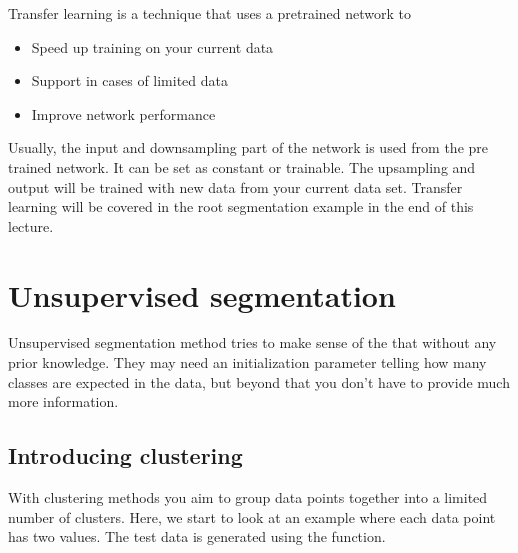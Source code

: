 \documentclass[letterpaper,10pt,english]{sphinxmanual}
\begin{document}
Transfer learning is a technique that uses a pre\sphinxhyphen{}trained network to
\begin{itemize}
\item {} 
Speed up training on your current data

\item {} 
Support in cases of limited data

\item {} 
Improve network performance

\end{itemize}

Usually, the input and downsampling part of the network is used from the pre trained network. It can be set as constant or trainable. The upsampling and output will be trained with new data from your current data set. Transfer learning will be covered in the root segmentation example in the end of this lecture.


\chapter{Unsupervised segmentation}
\label{\detokenize{ML4NeutronImageSegmentation:unsupervised-segmentation}}
Unsupervised segmentation method tries to make sense of the that without any prior knowledge. They may need an initialization parameter telling how many classes are expected in the data, but beyond that you don’t have to provide much more information.


\section{Introducing clustering}
\label{\detokenize{ML4NeutronImageSegmentation:introducing-clustering}}
With clustering methods you aim to group data points together into a limited number of clusters. Here, we start to look at an example where each data point has two values. The test data is generated using the  function.

\begin{sphinxVerbatim}[commandchars=\\\{\}]
   \PYG{p}{[}
                        \PYG{p}{]} \PYG{p}{[} \PYG{p}{]}
  
\end{sphinxVerbatim}
\end{document}
